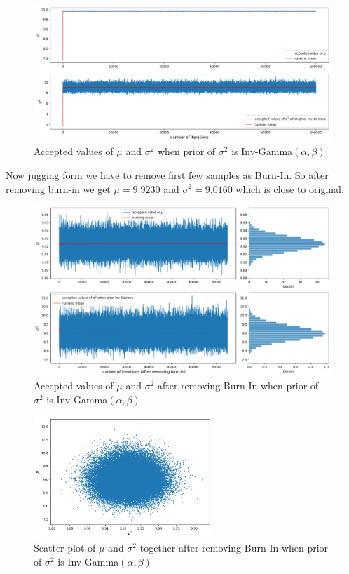\begin{example}
    \begin{figure}[H]
        \centering
        \includegraphics[width=1\textwidth]{images/gibbs/example3/inv-gamma-pre-burnin.png}
        \caption{Accepted values of $ \mu $ and $ \sigma^{2} $ when prior of $ \sigma^{2} $ is Inv-Gamma$(\alpha,\beta)$}
        \label{fig:inv-gamma pre burn-in}
    \end{figure}
    Now jugging form  we have to remove first few samples as Burn-In. So after removing burn-in we get $ \mu = 9.9230 $ and $ \sigma^{2}=9.0160 $ which is close to original.
    \begin{figure}[H]
        \centering
        \includegraphics[width=1\textwidth]{images/gibbs/example3/inv-gamma-post-burnin.png}
        \caption{Accepted values of $ \mu $ and $ \sigma^{2} $ after removing Burn-In when prior of $ \sigma^{2} $ is Inv-Gamma$(\alpha,\beta)$}
    \end{figure}
    \begin{figure}[H]
        \centering
        \includegraphics[width=0.6\textwidth]{images/gibbs/example3/inv-gamma-scatter-post-burnin.png}
        \caption{Scatter plot of $ \mu $ and $ \sigma^{2} $ together after removing Burn-In when prior of $ \sigma^{2} $ is Inv-Gamma$(\alpha,\beta)$}
    \end{figure}
    

\end{example}
